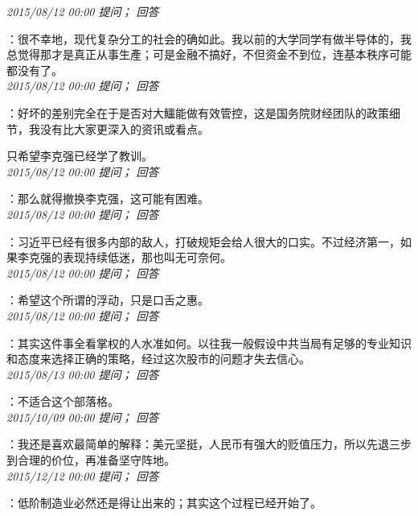 \documentclass[twocolumn]{ctexart}
\begin{document}
\textit{\hfill\noindent\small 2015/08/12 00:00 提问； 回答}

：很不幸地，现代复杂分工的社会的确如此。我以前的大学同学有做半导体的，我总觉得那才是真正从事生產；可是金融不搞好，不但资金不到位，连基本秩序可能都没有了。\\

\textit{\hfill\noindent\small 2015/08/12 00:00 提问； 回答}

：好坏的差别完全在于是否对大鱷能做有效管控，这是国务院财经团队的政策细节，我没有比大家更深入的资讯或看点。

只希望李克强已经学了教训。\\

\textit{\hfill\noindent\small 2015/08/12 00:00 提问； 回答}

：那么就得撤换李克强，这可能有困难。\\

\textit{\hfill\noindent\small 2015/08/12 00:00 提问； 回答}

：习近平已经有很多内部的敌人，打破规矩会给人很大的口实。不过经济第一，如果李克强的表现持续低迷，那也叫无可奈何。\\

\textit{\hfill\noindent\small 2015/08/12 00:00 提问； 回答}

：希望这个所谓的浮动，只是口舌之惠。\\

\textit{\hfill\noindent\small 2015/08/12 00:00 提问； 回答}

：其实这件事全看掌权的人水准如何。以往我一般假设中共当局有足够的专业知识和态度来选择正确的策略，经过这次股市的问题才失去信心。\\

\textit{\hfill\noindent\small 2015/08/13 00:00 提问； 回答}

：不适合这个部落格。\\

\textit{\hfill\noindent\small 2015/10/09 00:00 提问； 回答}

：我还是喜欢最简单的解释：美元坚挺，人民币有强大的贬值压力，所以先退三步到合理的价位，再准备坚守阵地。\\

\textit{\hfill\noindent\small 2015/12/12 00:00 提问； 回答}

：低阶制造业必然还是得让出来的；其实这个过程已经开始了。
\end{document}

